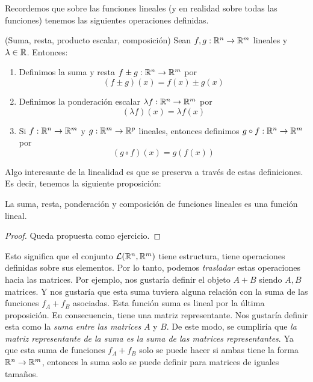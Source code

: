 Recordemos que sobre las funciones lineales (y en realidad sobre todas las funciones) tenemos las siguientes operaciones definidas.

\begin{definition} (Suma, resta, producto escalar, composición)
    Sean $f, g: \mathbb{R}^n \to \mathbb{R}^m$ lineales y $\lambda \in \mathbb{R}$. Entonces:
    \begin{enumerate}
        \item Definimos la suma y resta $f \pm g: \mathbb{R}^n \to \mathbb{R}^m$ por
        \[(f \pm g)(x) = f(x) \pm g(x)\]
        \item Definimos la ponderación escalar $\lambda f : \mathbb{R}^n \to \mathbb{R}^m$ por
        \[(\lambda f)(x) = \lambda f(x)\]
        \item Si $f: \mathbb{R}^n \to \mathbb{R}^m$ y $g: \mathbb{R}^m \to \mathbb{R}^p$ lineales, entonces definimos $g \circ f : \mathbb{R}^n \to \mathbb{R}^m$ por
        \[(g \circ f) (x) = g(f(x))\]
    \end{enumerate}
\end{definition}

Algo interesante de la linealidad es que se preserva a través de estas definiciones. Es decir, tenemos la siguiente proposición:

\begin{proposition} \label{prop:function-linearity}
    La suma, resta, ponderación y composición de funciones lineales es una función lineal.
\end{proposition}

\begin{proof}
    Queda propuesta como ejercicio.
\end{proof}

Esto significa que el conjunto $\mathcal{L}(\mathbb{R}^n, \mathbb{R}^m)$ tiene estructura, tiene operaciones definidas sobre sus elementos. Por lo tanto, podemos \textit{trasladar} estas operaciones hacia las matrices. Por ejemplo, nos gustaría definir el objeto $A + B$ siendo $A, B$ matrices. Y nos gustaría que esta suma tuviera alguna relación con la suma de las funciones $f_A + f_B$ asociadas. Esta función suma es lineal por la última proposición. En consecuencia, tiene una matriz representante. Nos gustaría definir esta como la \textit{suma entre las matrices} $A$ y $B$. De este modo, se cumpliría que \textit{la matriz representante de la suma es la suma de las matrices representantes}. Ya que esta suma de funciones $f_A + f_B$ solo se puede hacer si ambas tiene la forma $\mathbb{R}^n \to \mathbb{R}^m$, entonces la suma solo se puede definir para matrices de iguales tamaños.

